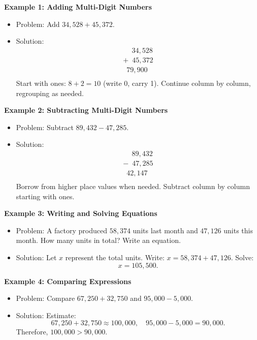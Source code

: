 \documentclass[12pt]{article}
\begin{document}
\begin{tcolorbox}[colframe=black!60, colback=white, 
coltitle=black, colbacktitle=black!15, fonttitle=\bfseries\Large, 
title=Examples, halign title=center, left=10pt, right=10pt, top=10pt, bottom=15pt]
\textbf{Example 1: Adding Multi-Digit Numbers}
\begin{itemize}
    \item Problem: Add \( 34,528 + 45,372 \).
    \item Solution:
    \[
    \begin{array}{r}
       \phantom{+} 34,528 \\
    + \phantom{4}45,372 \\
    \hline
       \phantom{4}79,900 \\
    \end{array}
    \]
    Start with ones: \( 8 + 2 = 10 \) (write 0, carry 1). Continue column by column, regrouping as needed.
\end{itemize}

\textbf{Example 2: Subtracting Multi-Digit Numbers}
\begin{itemize}
    \item Problem: Subtract \( 89,432 - 47,285 \).
    \item Solution:
    \[
    \begin{array}{r}
       \phantom{+} 89,432 \\
    - \phantom{4}47,285 \\
    \hline
       \phantom{4}42,147 \\
    \end{array}
    \]
    Borrow from higher place values when needed. Subtract column by column starting with ones.
\end{itemize}

\textbf{Example 3: Writing and Solving Equations}
\begin{itemize}
    \item Problem: A factory produced \( 58,374 \) units last month and \( 47,126 \) units this month. How many units in total? Write an equation.
    \item Solution: Let \( x \) represent the total units. Write: \( x = 58,374 + 47,126 \). Solve:
    \[
    x = 105,500.
    \]
\end{itemize}

\textbf{Example 4: Comparing Expressions}
\begin{itemize}
    \item Problem: Compare \( 67,250 + 32,750 \) and \( 95,000 - 5,000 \).
    \item Solution: Estimate:
    \[
    67,250 + 32,750 \approx 100,000, \quad 95,000 - 5,000 = 90,000.
    \]
    Therefore, \( 100,000 > 90,000 \).
\end{itemize}
\end{tcolorbox}
\end{document}
